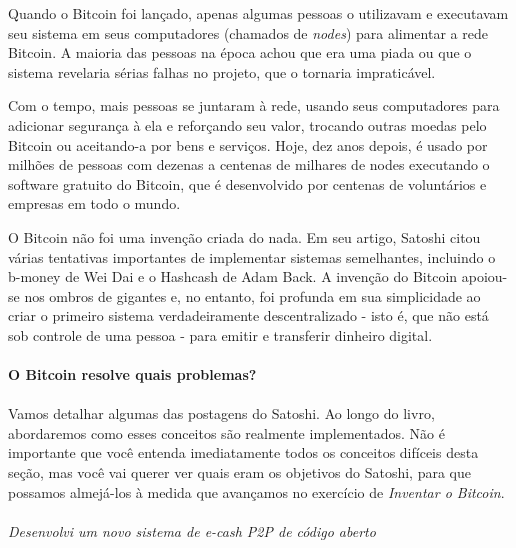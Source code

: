 Quando o Bitcoin foi lançado, apenas algumas pessoas o utilizavam e executavam seu sistema em seus computadores (chamados de \textit{nodes}) para alimentar a rede Bitcoin. A maioria das pessoas na época achou que era uma piada ou que o sistema revelaria sérias falhas no projeto, que o tornaria impraticável.

Com o tempo, mais pessoas se juntaram à rede, usando seus computadores para adicionar segurança à ela e reforçando seu valor, trocando outras moedas pelo Bitcoin ou aceitando-a por bens e serviços. Hoje, dez anos depois, é usado por milhões de pessoas com dezenas a centenas de milhares de nodes executando o software gratuito do Bitcoin, que é desenvolvido por centenas de voluntários e empresas em todo o mundo.

O Bitcoin não foi uma invenção criada do nada. Em seu artigo, Satoshi citou várias tentativas importantes de implementar sistemas semelhantes, incluindo o b-money de Wei Dai e o Hashcash de Adam Back. A invenção do Bitcoin apoiou-se nos ombros de gigantes e, no entanto, foi profunda em sua simplicidade ao criar o primeiro sistema verdadeiramente descentralizado - isto é, que não está sob controle de uma pessoa - para emitir e transferir dinheiro digital.

\newpage
\paragraph{O Bitcoin resolve quais problemas?}
\paragraph{}
 
Vamos detalhar algumas das postagens do Satoshi. Ao longo do livro, abordaremos como esses conceitos são realmente implementados. Não é importante que você entenda imediatamente todos os conceitos difíceis desta seção, mas você vai querer ver quais eram os objetivos do Satoshi, para que possamos almejá-los à medida que avançamos no exercício de \textit{Inventar o Bitcoin}.


\paragraph{}
\textit{Desenvolvi um novo sistema de e-cash P2P de código aberto}
\paragraph{}

